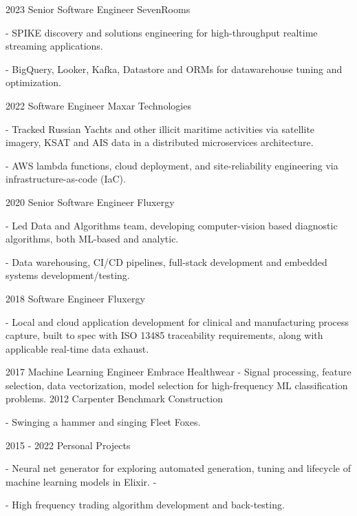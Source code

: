 \documentclass[]{twentysecondcv}
\begin{document}
\begin{twenty}
  \twentyitem
    {2023}
    {Senior Software Engineer}
    {SevenRooms}
    {- SPIKE discovery and solutions engineering for high-throughput realtime streaming applications.

	- BigQuery, Looker, Kafka, Datastore and ORMs for datawarehouse tuning and optimization.

}
  \twentyitem
    {2022}
    {Software Engineer}
    {Maxar Technologies}
    {- Tracked Russian Yachts and other illicit maritime activities via satellite imagery, KSAT and AIS data in a distributed microservices architecture.

	- AWS lambda functions, cloud deployment, and site-reliability engineering via infrastructure-as-code (IaC).

}

  \twentyitem
    {2020}
    {Senior Software Engineer}
    {Fluxergy}
    {- Led Data and Algorithms team, developing computer-vision based diagnostic algorithms, both ML-based and analytic.

	- Data warehousing, CI/CD pipelines, full-stack development and embedded systems development/testing.
	
	} 
  \twentyitem
    {2018}
    {Software Engineer}
    {Fluxergy}
	{- Local and cloud application development for clinical and manufacturing process capture, built to spec with ISO 13485 traceability requirements, along with applicable real-time data exhaust.

	} 
  \twentyitem
    {2017}
    {Machine Learning Engineer}
    {Embrace Healthwear}
    {- Signal processing, feature selection, data vectorization, model selection for high-frequency ML classification problems.
	} 
  \twentyitem
    {2012}
    {Carpenter}
    {Benchmark Construction}
    {- Swinging a hammer and singing Fleet Foxes.

	} 
  \twentyitem
    {2015 - 2022}
    {Personal Projects}
    {}
    {- Neural net generator for exploring automated generation, tuning and lifecycle of machine learning models in Elixir.
	- 

	- High frequency trading algorithm development and back-testing.} 

\end{twenty}
\end{document}
